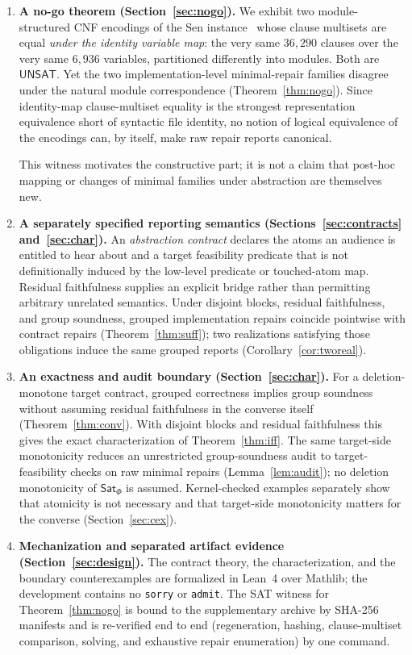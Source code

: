 \documentclass[sigplan,10pt,review,anonymous]{acmart}
\theoremstyle{acmdefinition}
\newcommand{\code}[1]{\texttt{#1}}
\newcommand{\SatPhi}{{\mathsf{Sat}_\Phi}}
\newcommand{\UNSAT}{\mathsf{UNSAT}}
\begin{document}
\begin{enumerate}[leftmargin=1.6em]
\item \textbf{A no-go theorem (Section~\ref{sec:nogo}).} We exhibit two
module-structured CNF encodings of the Sen instance~\cite{Sen1970} whose
clause multisets are equal
\emph{under the identity variable map}: the very same $36{,}290$ clauses over
the very same $6{,}936$ variables, partitioned differently into modules. Both
are $\UNSAT$. Yet the two implementation-level minimal-repair families
disagree under the natural module correspondence
(Theorem~\ref{thm:nogo}). Since identity-map clause-multiset equality is the
strongest representation equivalence short of syntactic file identity, no
notion of logical equivalence of the encodings can, by itself, make raw repair
reports canonical.

This witness motivates the constructive part; it is not a claim that post-hoc
mapping or changes of minimal families under abstraction are themselves new.

\item \textbf{A separately specified reporting semantics
(Sections~\ref{sec:contracts} and~\ref{sec:char}).} An \emph{abstraction
contract} declares the atoms an audience is entitled to hear about and a
target feasibility predicate that is not definitionally induced by the
low-level predicate or touched-atom map. Residual faithfulness supplies an
explicit bridge rather than permitting arbitrary unrelated semantics. Under
disjoint blocks, residual faithfulness, and group soundness, grouped
implementation repairs coincide pointwise with contract repairs
(Theorem~\ref{thm:suff}); two realizations satisfying those obligations induce
the same grouped reports (Corollary~\ref{cor:tworeal}).

\item \textbf{An exactness and audit boundary
(Section~\ref{sec:char}).} For a deletion-monotone target contract, grouped
correctness implies group soundness without assuming residual faithfulness in
the converse itself (Theorem~\ref{thm:conv}). With disjoint blocks and
residual faithfulness this gives the exact characterization of
Theorem~\ref{thm:iff}. The same target-side monotonicity reduces an unrestricted
group-soundness audit to target-feasibility checks on raw minimal repairs
(Lemma~\ref{lem:audit}); no deletion monotonicity of $\SatPhi$ is assumed.
Kernel-checked examples separately show that atomicity is not necessary and
that target-side monotonicity matters for the converse
(Section~\ref{sec:cex}).

\item \textbf{Mechanization and separated artifact evidence
(Section~\ref{sec:design}).} The
contract theory, the characterization, and the boundary counterexamples are
formalized in Lean~4 over Mathlib; the development contains no \code{sorry}
or \code{admit}. The SAT witness for Theorem~\ref{thm:nogo} is bound to the
supplementary archive by SHA-256 manifests and is re-verified end to end
(regeneration, hashing, clause-multiset comparison, solving, and exhaustive
repair enumeration) by one command.
\end{enumerate}
\end{document}
